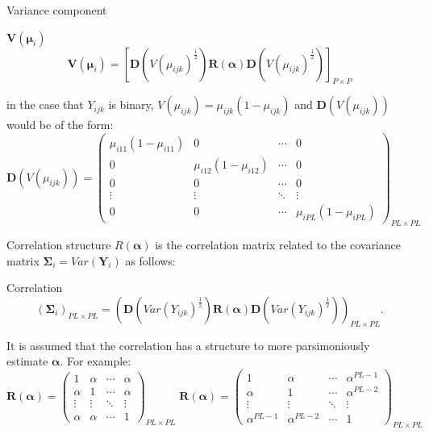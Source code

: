 \documentclass[t,9pt]{beamer}
\begin{document}
 \begin{frame}[fragile]{Variance component}
 \begin{block}{$\pmb{V}(\pmb{\mu}_i)$ }
     \begin{equation}\nonumber
        \pmb{V}(\pmb{\mu}_i)=\left[\pmb{D}(V(\mu_{ijk})^{\frac{1}{2}}) \pmb{R}(\pmb{\pmb{ \alpha}}) \pmb{D}({V}(\mu_{ijk})^{\frac{1}{2}})\right]_{P \times P} 
     \end{equation}
 \end{block}
in the case that $Y_{ijk}$ is binary, $V(\mu_{ijk})=\mu_{ijk}(1-\mu_{ijk})$ and $\pmb{D}(V(\mu_{ijk}))$ would be of the form:
\begin{equation}\nonumber
    \pmb{D}(V(\mu_{ijk}))=\begin{pmatrix}
     \mu_{i11}(1-\mu_{i11}) &  0 & \cdots & 0\\
     0 & \mu_{i12}(1- \mu_{i12}) & \cdots & 0 \\
     0 & 0 & \cdots & 0 \\
      \vdots & \vdots & \ddots & \vdots\\
     0&0& \cdots  &  \mu_{iPL}(1- \mu_{iPL})
    \end{pmatrix}_{PL \times PL}
\end{equation} 
\end{frame}

\begin{frame}[fragile]{Correlation structure}
$R(\pmb{ \alpha})$ is the correlation matrix related to the covariance matrix $\pmb{\Sigma}_{i}=Var(\pmb{Y}_{i})$ as follows:
 \begin{block}{Correlation }
     \begin{equation}\nonumber
        \left( \pmb{\Sigma}_{i}\right)_{PL \times PL}= \left( \pmb{D}(Var(Y_{ijk})^{\frac{1}{2}}) \pmb{R}(\pmb{\alpha}) \pmb{D}(Var(Y_{ijk})^{\frac{1}{2}})\right)_{PL \times PL}.
     \end{equation}
 \end{block} 
It is assumed that the correlation has a structure to more parsimoniously estimate $\pmb{ \alpha}$. For example:
\begin{equation}\nonumber
     \pmb{R}(\pmb{\alpha}) = \begin{pmatrix}
     1 & \alpha & \cdots& \alpha\\
     \alpha& 1 & \cdots & \alpha\\
     \vdots& \vdots & \ddots & \vdots\\
     \alpha& \alpha& \cdots & 1
    \end{pmatrix}_{PL\times PL} \;      \pmb{R}(\pmb{\alpha}) = \begin{pmatrix}
     1 & \alpha & \cdots& \alpha^{PL-1}\\
     \alpha& 1 & \cdots & \alpha^{PL-2}\\
     \vdots& \vdots & \ddots & \vdots\\
     \alpha^{PL-1}& \alpha^{PL-2}& \cdots & 1
    \end{pmatrix}_{PL\times PL}
\end{equation}
\end{frame}
\end{document}
